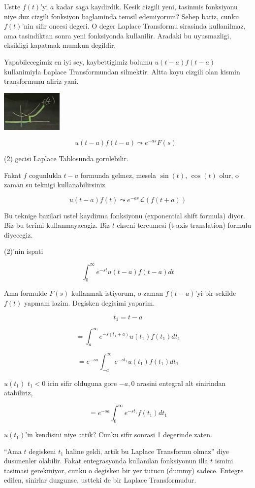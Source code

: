 \documentclass[12pt,fleqn]{article}\usepackage{../common}
\begin{document}
Ustte $f(t)$'yi $a$ kadar saga kaydirdik. Kesik cizgili yeni, tasinmis
fonksiyonu niye duz cizgili fonksiyon baglaminda temsil edemiyorum? Sebep
bariz, cunku $f(t)$'nin sifir oncesi degeri. O deger Laplace Transformu
sirasinda kullanilmaz, ama tasindiktan sonra yeni fonksiyonda
kullanilir. Aradaki bu uyusmazligi, eksikligi kapatmak mumkun degildir. 

Yapabilecegimiz en iyi sey, kaybettigimiz bolumu $u(t-a)f(t-a)$ kullanimiyla
Laplace Transformundan silmektir. Altta koyu cizgili olan kismin
transformunu aliriz yani.

\includegraphics[height=2cm]{22_8.png}

\[ u(t-a)f(t-a) \leadsto e^{-as}F(s) 
\ \ \ \label{2}
\]

(2) gecisi Laplace Tablosunda gorulebilir.

Fakat $f$ cogunlukla $t-a$ formunda gelmez, mesela $\sin(t)$, $\cos(t)$
olur, o zaman su teknigi kullanabilirsiniz

\[ u(t-a)f(t) \leadsto e^{-as}\mathcal{L}(f(t+a)) \]

Bu teknige bazilari ustel kaydirma fonksiyonu (exponential shift formula)
diyor. Biz bu terimi kullanmayacagiz. Biz $t$ ekseni tercumesi (t-axis
translation) formulu diyecegiz. 

(2)'nin ispati

\[ \int_{0}^{\infty}e^{-st}u(t-a)f(t-a) dt \]

Ama formulde $F(s)$ kullanmak istiyorum, o zaman $f(t-a)$'yi bir sekilde
$f(t)$ yapmam lazim. Degisken degisimi yaparim. 

\[ t_1 = t-a \]

\[ = \int_{a}^{\infty}e^{-s(t_1+a)}u(t_1)f(t_1) dt_1 \]

\[ = e^{-sa} \int_{-a}^{\infty}e^{-st_1}u(t_1)f(t_1) dt_1 \]

$u(t_1)$ $t_1<0$ icin sifir olduguna gore $-a,0$ arasini entegral alt
sinirindan atabiliriz, 

\[ = e^{-sa} \int_{0}^{\infty}e^{-st_1}f(t_1) dt_1 \]

$u(t_1)$'in kendisini niye attik? Cunku sifir sonrasi 1 degerinde zaten. 

``Ama $t$ degiskeni $t_1$ haline geldi, artik bu Laplace Transformu olmaz''
diye dusunenler olabilir. Fakat entegrasyonda kullanilan fonksiyonun illa
$t$ ismini tasimasi gerekmiyor, cunku o degisken bir yer tutucu (dummy)
sadece. Entegre edilen, sinirlar duzgunse, ustteki de bir Laplace
Transformudur.
\end{document}
